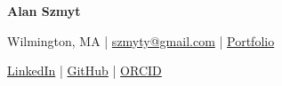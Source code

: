 %

\begin{center}
{\Huge\bfseries Alan Szmyt}\par
\vspace{0.3em}

\small

Wilmington, MA
\hspace{0.5em}|\hspace{0.5em}
\href{mailto:szmyty@gmail.com}{szmyty@gmail.com}
\hspace{0.5em}|\hspace{0.5em}
\href{https://szmyty.vercel.app}{Portfolio}

\vspace{0.2em}

\href{https://www.linkedin.com/in/alanszmyt/}{LinkedIn}
\hspace{0.5em}|\hspace{0.5em}
\href{https://github.com/szmyty/}{GitHub}
\hspace{0.5em}|\hspace{0.5em}
\href{https://orcid.org/0009-0008-5291-9795}{ORCID}
\end{center}
